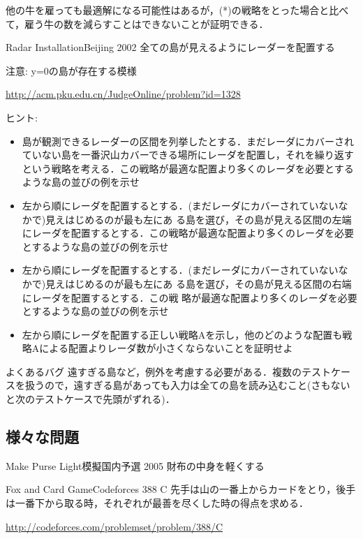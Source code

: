 他の牛を雇っても最適解になる可能性はあるが，(*)の戦略をとった場合と比べて，雇う牛の数を減らすことはできないことが証明できる．


\begin{pbox}{Radar Installation}{Beijing 2002}
全ての島が見えるようにレーダーを配置する

注意: y=0の島が存在する模様

\url{http://acm.pku.edu.cn/JudgeOnline/problem?id=1328}
\end{pbox}


ヒント: 
\begin{itemize}
\setlength{\itemsep}{0pt}
\item 島が観測できるレーダーの区間を列挙したとする．まだレーダにカバーされていない島を一番沢山カバーできる場所にレーダを配置し，それを繰り返すという戦略を考える．この戦略が最適な配置より多くのレーダを必要とするような島の並びの例を示せ
\item 左から順にレーダを配置するとする．(まだレーダにカバーされていないなかで)見えはじめるのが最も左にあ
  る島を選び，その島が見える区間の左端にレーダを配置するとする．この戦略が最適な配置より多くのレーダを必要とするような島の並びの例を示せ
\item 左から順にレーダを配置するとする．(まだレーダにカバーされていないなかで)見えはじめるのが最も左にあ
  る島を選び，その島が見える区間の右端にレーダを配置するとする．この戦
  略が最適な配置より多くのレーダを必要とするような島の並びの例を示せ
\item 左から順にレーダを配置する正しい戦略Aを示し，他のどのような配置も戦略Aによる配置よりレーダ数が小さくならないことを証明せよ
\end{itemize}

\begin{debugbox}{よくあるバグ}
遠すぎる島など，例外を考慮する必要がある．複数のテストケースを扱うので，遠すぎる島があっても入力は全ての島を読み込むこと(さもないと次のテストケースで先頭がずれる)．
\end{debugbox}

\subsection{様々な問題}

\begin{pbox}{Make Purse Light}{模擬国内予選 2005}
財布の中身を軽くする
  
\end{pbox}

\begin{pbox}{Fox and Card Game}{Codeforces 388 C}
先手は山の一番上からカードをとり，後手は一番下から取る時，それぞれが最善を尽くした時の得点を求める．

\url{http://codeforces.com/problemset/problem/388/C}
\end{pbox}

